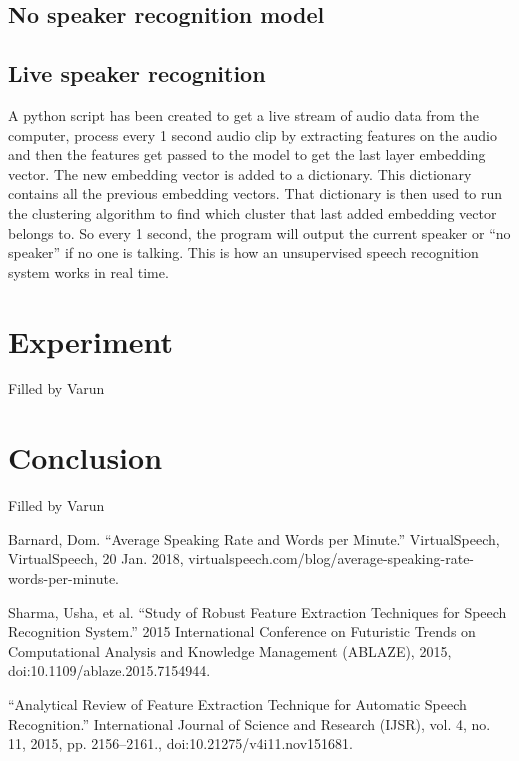\documentclass[10pt,twocolumn,letterpaper]{article}
\begin{document}
\subsection{No speaker recognition model} 

\subsection{Live speaker recognition}

A python script has been created to get a live stream of audio data from the computer, process every 1 second audio clip by extracting features on the audio and then the features get passed to the model to get the last layer embedding vector. The new embedding vector is added to a dictionary. This dictionary contains all the previous embedding vectors. That dictionary is then used to run the clustering algorithm to find which cluster that last added embedding vector belongs to.  So every 1 second, the program will output the current speaker or “no speaker” if no one is talking. This is how an unsupervised speech recognition system works in real time.


\section{Experiment}

Filled by Varun


\section{Conclusion}

Filled by Varun



\begin{thebibliography}{1}

      Barnard, Dom. “Average Speaking Rate and Words per Minute.” VirtualSpeech, VirtualSpeech, 20 Jan. 2018, virtualspeech.com/blog/average-speaking-rate-words-per-minute. 
  
      Sharma, Usha, et al. “Study of Robust Feature Extraction Techniques for Speech Recognition System.” 2015 International Conference on Futuristic Trends on Computational Analysis and Knowledge Management (ABLAZE), 2015, doi:10.1109/ablaze.2015.7154944. 
  
    “Analytical Review of Feature Extraction Technique for Automatic Speech Recognition.” International Journal of Science and Research (IJSR), vol. 4, no. 11, 2015, pp. 2156–2161., doi:10.21275/v4i11.nov151681. 
  
  
\end{thebibliography}
\end{document}
